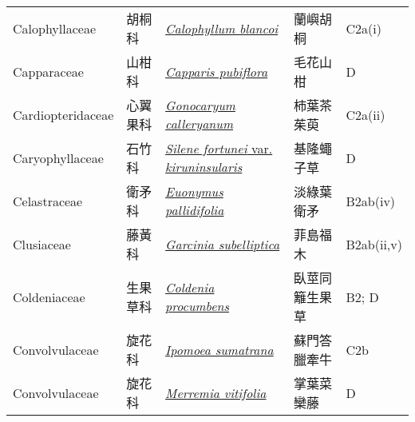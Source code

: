{\begin{longtable}{L{2.5cm}L{2cm}L{5cm}L{2.5cm}L{3cm}}
    Calophyllaceae & 胡桐科 & \href{http://www.theplantlist.org/tpl1.1/search?q=Calophyllum+blancoi}{\textit{Calophyllum blancoi} } & 蘭嶼胡桐 & C2a(i)    \\
    Capparaceae & 山柑科 & \href{http://www.theplantlist.org/tpl1.1/search?q=Capparis+pubiflora}{\textit{Capparis pubiflora} } & 毛花山柑 & D    \\
    Cardiopteridaceae & 心翼果科 & \href{http://www.theplantlist.org/tpl1.1/search?q=Gonocaryum+calleryanum}{\textit{Gonocaryum calleryanum} } & 柿葉茶茱萸 & C2a(ii)    \\
    Caryophyllaceae & 石竹科 & \href{http://www.theplantlist.org/tpl1.1/search?q=Silene+fortunei+var.+kiruninsularis}{\textit{Silene fortunei} var. \textit{kiruninsularis} } & 基隆蠅子草 & D    \\
    Celastraceae & 衛矛科 & \href{http://www.theplantlist.org/tpl1.1/search?q=Euonymus+pallidifolia}{\textit{Euonymus pallidifolia} } & 淡綠葉衛矛 & B2ab(iv)    \\
    Clusiaceae & 藤黃科 & \href{http://www.theplantlist.org/tpl1.1/search?q=Garcinia+subelliptica}{\textit{Garcinia subelliptica} } & 菲島福木 & B2ab(ii,v)    \\
    Coldeniaceae & 生果草科 & \href{http://www.theplantlist.org/tpl1.1/search?q=Coldenia+procumbens}{\textit{Coldenia procumbens} } & 臥莖同籬生果草 & B2; D    \\
    Convolvulaceae & 旋花科 & \href{http://www.theplantlist.org/tpl1.1/search?q=Ipomoea+sumatrana}{\textit{Ipomoea sumatrana} } & 蘇門答臘牽牛 & C2b    \\
    Convolvulaceae & 旋花科 & \href{http://www.theplantlist.org/tpl1.1/search?q=Merremia+vitifolia}{\textit{Merremia vitifolia} } & 掌葉菜欒藤 & D    \\

\end{longtable}}
